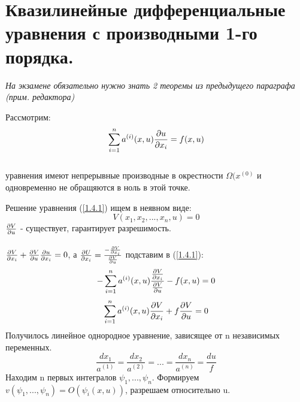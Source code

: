 \documentclass[../main.tex]{subfiles}
\begin{document}
\section{Квазилинейные дифференциальные уравнения с производными 1-го порядка.}


\textit{На экзамене обязательно нужно знать 2 теоремы из предыдущего параграфа (прим. редактора)}


\par Рассмотрим:
\begin{equation}\label{1.4.1}
	\sum_{i=1}^{n}a^{(i)}(x,u)\frac{\partial u}{\partial x_i}=f(x,u)
\end{equation}
\\ уравнения имеют непрерывные производные в окрестности $\Omega(x^{(0)}$ и одновременно не обращяются в ноль в этой точке.\\

\par Решение уравнения (\ref{1.4.1}) ищем в неявном виде:
$$V(x_1,x_2,...,x_n,u)=0$$
$\frac{\partial V}{\partial u}$ - существует, гарантирует разрешимость.
\\ \\
$\frac{\partial V}{\partial x_i}+\frac{\partial V}{\partial u}\frac{\partial u}{\partial x_i} = 0$, а $\frac{\partial U}{\partial x_i} = \frac{-\frac{\partial V}{\partial x_i}}{\frac{\partial V}{\partial u}}$ подставим в (\ref{1.4.1}):\\

$$-\sum_{i=1}^{n}a^{(i)}(x,u)\frac{\frac{\partial V}{\partial x_i}}{\frac{\partial V}{\partial u}}-f(x,u)=0$$
$$\sum_{i=1}^{n}a^{(i)}(x,u)\frac{\partial V}{\partial x_i}+f\frac{\partial V}{\partial u} = 0$$
Получилось линейное однородное уравнение, зависящее от n независимых переменных.
$$\frac{dx_1}{a^{(1)}}=\frac{dx_2}{a^{(2)}}=...=\frac{dx_n}{a^{(n)}}=\frac{du}{f}$$
Находим n первых интегралов $\psi_1,...,\psi_n$. Формируем $v(\psi_1,...,\psi_n)=O(\psi_i(x,u))$, разрешаем относительно u.
\end{document}
